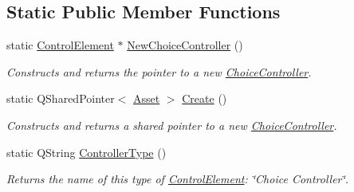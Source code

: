 \subsection*{Static Public Member Functions}
\begin{DoxyCompactItemize}
\item 
\hypertarget{class_picto_1_1_choice_controller_a8bc6698e77cea2758f945f3a21080a5e}{static \hyperlink{class_picto_1_1_control_element}{Control\-Element} $\ast$ \hyperlink{class_picto_1_1_choice_controller_a8bc6698e77cea2758f945f3a21080a5e}{New\-Choice\-Controller} ()}\label{class_picto_1_1_choice_controller_a8bc6698e77cea2758f945f3a21080a5e}

\begin{DoxyCompactList}\small\item\em Constructs and returns the pointer to a new \hyperlink{class_picto_1_1_choice_controller}{Choice\-Controller}. \end{DoxyCompactList}\item 
\hypertarget{class_picto_1_1_choice_controller_a1522e74b612454569d3ff71417272c2e}{static Q\-Shared\-Pointer$<$ \hyperlink{class_picto_1_1_asset}{Asset} $>$ \hyperlink{class_picto_1_1_choice_controller_a1522e74b612454569d3ff71417272c2e}{Create} ()}\label{class_picto_1_1_choice_controller_a1522e74b612454569d3ff71417272c2e}

\begin{DoxyCompactList}\small\item\em Constructs and returns a shared pointer to a new \hyperlink{class_picto_1_1_choice_controller}{Choice\-Controller}. \end{DoxyCompactList}\item 
\hypertarget{class_picto_1_1_choice_controller_ae9e828ce5e72d120974bf8e0cda625f1}{static Q\-String \hyperlink{class_picto_1_1_choice_controller_ae9e828ce5e72d120974bf8e0cda625f1}{Controller\-Type} ()}\label{class_picto_1_1_choice_controller_ae9e828ce5e72d120974bf8e0cda625f1}

\begin{DoxyCompactList}\small\item\em Returns the name of this type of \hyperlink{class_picto_1_1_control_element}{Control\-Element}\-: \char`\"{}\-Choice Controller\char`\"{}. \end{DoxyCompactList}\end{DoxyCompactItemize}
